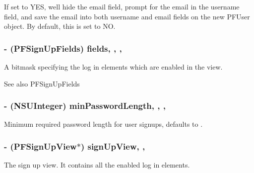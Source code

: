 If set to {\ttfamily Y\+E\+S}, we\textquotesingle{}ll hide the email field, prompt for the email in the username field, and save the email into both username and email fields on the new {\ttfamily P\+F\+User} object. By default, this is set to {\ttfamily N\+O}. \hypertarget{interface_p_f_sign_up_view_controller_a14aee5e2f66057ce9a998fb8576d412b}{}
\subsubsection[{fields}]{\setlength{\rightskip}{0pt plus 5cm}-\/ (P\+F\+Sign\+Up\+Fields) fields\hspace{0.3cm}{\ttfamily [read]}, {\ttfamily [write]}, {\ttfamily [nonatomic]}, {\ttfamily [assign]}}\label{interface_p_f_sign_up_view_controller_a14aee5e2f66057ce9a998fb8576d412b}
A bitmask specifying the log in elements which are enabled in the view.

\begin{DoxySeeAlso}{See also}
P\+F\+Sign\+Up\+Fields 
\end{DoxySeeAlso}
\hypertarget{interface_p_f_sign_up_view_controller_a9142fa63faede5be9fe94ab55851c8a7}{}
\subsubsection[{min\+Password\+Length}]{\setlength{\rightskip}{0pt plus 5cm}-\/ (N\+S\+U\+Integer) min\+Password\+Length\hspace{0.3cm}{\ttfamily [read]}, {\ttfamily [write]}, {\ttfamily [nonatomic]}, {\ttfamily [assign]}}\label{interface_p_f_sign_up_view_controller_a9142fa63faede5be9fe94ab55851c8a7}
Minimum required password length for user signups, defaults to {}. \hypertarget{interface_p_f_sign_up_view_controller_aabe62b83ad3128c64650b19e995aad27}{}
\subsubsection[{sign\+Up\+View}]{\setlength{\rightskip}{0pt plus 5cm}-\/ ({\bf P\+F\+Sign\+Up\+View}$\ast$) sign\+Up\+View\hspace{0.3cm}{\ttfamily [read]}, {\ttfamily [nonatomic]}, {\ttfamily [strong]}}\label{interface_p_f_sign_up_view_controller_aabe62b83ad3128c64650b19e995aad27}
The sign up view. It contains all the enabled log in elements.

